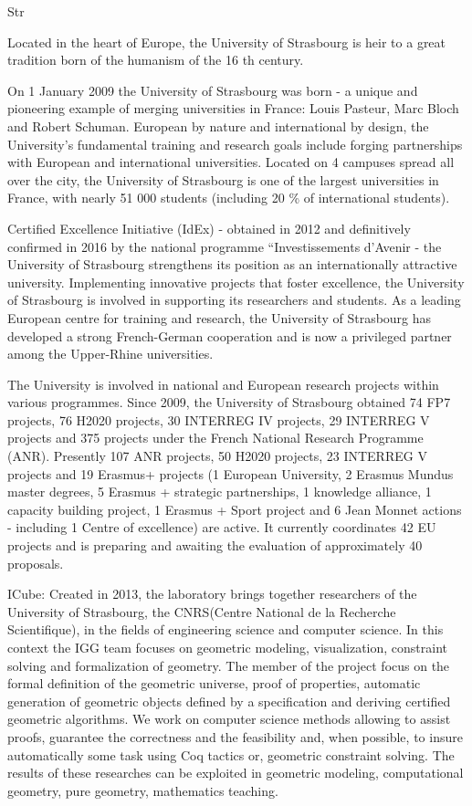 \begin{sitedescription}{Str}


Located in the heart of Europe, the University of Strasbourg is heir to a great tradition born of
the humanism of the 16 th century.

On 1 January 2009 the University of Strasbourg was born - a unique and pioneering
example of merging universities in France: Louis Pasteur, Marc Bloch and Robert Schuman.
European by nature and international by design, the University’s fundamental training and
research goals include forging partnerships with European and international universities.
Located on 4 campuses spread all over the city, the University of Strasbourg is one of the
largest universities in France, with nearly 51 000 students (including 20 \% of international
students).

Certified Excellence Initiative (IdEx) - obtained in 2012 and definitively confirmed in 2016
by the national programme “Investissements d’Avenir - the University of Strasbourg
strengthens its position as an internationally attractive university. Implementing innovative
projects that foster excellence, the University of Strasbourg is involved in supporting its
researchers and students.
As a leading European centre for training and research, the University of Strasbourg has
developed a strong French-German cooperation and is now a privileged partner among the
Upper-Rhine universities.

The University is involved in national and European research projects within various
programmes. Since 2009, the University of Strasbourg obtained 74 FP7 projects, 76 H2020
projects, 30 INTERREG IV projects, 29 INTERREG V projects and 375 projects under the
French National Research Programme (ANR). Presently 107 ANR projects, 50 H2020
projects, 23 INTERREG V projects and 19 Erasmus+ projects (1 European University, 2
Erasmus Mundus master degrees, 5 Erasmus + strategic partnerships, 1 knowledge alliance, 1
capacity building project, 1 Erasmus + Sport project and 6 Jean Monnet actions - including 1
Centre of excellence) are active. It currently coordinates 42 EU projects and is preparing and
awaiting the evaluation of approximately 40 proposals.

ICube: Created in 2013, the laboratory brings together researchers of the University of Strasbourg, the CNRS(Centre National de la Recherche Scientifique), in the fields of engineering science and computer science.
In this context the IGG team focuses on geometric modeling, visualization, constraint solving and formalization of geometry. The member of the project focus on the formal definition of the geometric universe, proof of properties, automatic generation of geometric objects defined by a specification and deriving certified geometric algorithms. We work on computer science methods allowing to assist proofs, guarantee the correctness and the feasibility and, when possible, to insure automatically some task using Coq tactics or, geometric constraint solving. The results of these researches can be exploited in geometric modeling, computational geometry, pure geometry, mathematics teaching.


\end{sitedescription}
